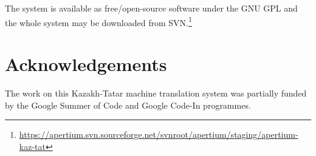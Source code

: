 \documentclass[a4paper,11pt]{article}
\begin{document}
The system is available as free/open-source software under the GNU GPL and the whole system may be downloaded
from SVN.\footnote{\url{https://apertium.svn.sourceforge.net/svnroot/apertium/staging/apertium-kaz-tat}}

\section*{Acknowledgements}

The work on this Kazakh-Tatar machine translation system was partially funded by the Google Summer of Code and Google Code-In programmes.

%
%

%

\end{document}
